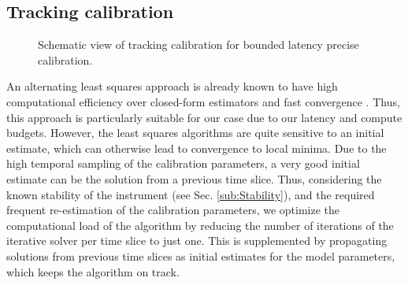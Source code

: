 \documentclass[referee]{aa}
\begin{document}
\subsection{Tracking calibration}

\begin{figure}[tbh]

\caption{\label{fig:trackcalSchematic}Schematic view of tracking calibration
for bounded latency precise calibration.}
\end{figure}

An  alternating   least  squares  approach   is  already  known  to   have  high
computational  efficiency  over  closed-form  estimators  and  fast  convergence
\citep{boonstra2003gain}.  Thus, this approach  is particularly suitable for our
case  due  to our  latency  and compute  budgets.   However,  the least  squares
algorithms are quite sensitive to  an initial estimate, which can otherwise lead
to  convergence to  local  minima. Due  to  the high  temporal  sampling of  the
calibration parameters, a very good initial  estimate can be the solution from a
previous  time slice.  Thus, considering  the known  stability of  the instrument
(see Sec.  \ref{sub:Stability}), and  the required frequent re-estimation of the
calibration parameters, we  optimize the computational load of  the algorithm by
reducing the number of iterations of  the iterative solver per time slice to just
one. This is  supplemented by propagating solutions from  previous time slices as
initial estimates for the model parameters, which keeps the algorithm on track.
\end{document}
